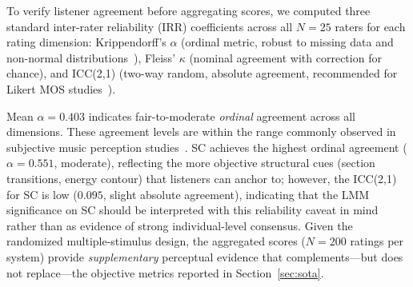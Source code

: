 \documentclass[pdflatex,sn-mathphys-num,twocolumn]{sn-jnl}
\theoremstyle{thmstyleone}
\theoremstyle{thmstyletwo}
\begin{document}
To verify listener agreement before aggregating scores, we computed three
standard inter-rater reliability (IRR) coefficients across all $N=25$ raters
for each rating dimension:
Krippendorff's $\alpha$ (ordinal metric, robust to missing data and
non-normal distributions~\cite{krippendorff2011computing}),
Fleiss' $\kappa$ (nominal agreement with correction for chance), and
ICC(2,1) (two-way random, absolute agreement,
recommended for Likert MOS studies~\cite{koo2016guideline}).

\begin{tableorg}[ht]
\centering\small
\caption{Inter-rater reliability for the MOS study ($N=25$).
  $\alpha$: Krippendorff's ordinal alpha;
  $\kappa$: Fleiss' kappa; ICC: ICC(2,1).
  Benchmarks: $\alpha/\kappa\geq0.80$ strong, $\geq0.61$ moderate,
  $\geq0.41$ fair (Landis \& Koch 1977); ICC$\geq0.75$ good~\cite{koo2016guideline}.}
\label{tab:irr}
\end{tableorg}

Mean $\alpha=0.403$ indicates fair-to-moderate \emph{ordinal} agreement across all
dimensions. These agreement levels are within the range commonly observed in subjective music perception studies~\cite{sturm2014mml}.
SC achieves the highest ordinal agreement ($\alpha=0.551$, moderate), reflecting the
more objective structural cues (section transitions, energy contour) that
listeners can anchor to; however, the ICC(2,1) for SC is low ($0.095$, slight
absolute agreement), indicating that the LMM significance on SC should be
interpreted with this reliability caveat in mind rather than as evidence of strong
individual-level consensus.
Given the randomized multiple-stimulus design, the aggregated scores ($N=200$
ratings per system) provide \emph{supplementary} perceptual evidence that
complements---but does not replace---the objective metrics reported in
Section~\ref{sec:sota}.
\end{document}
